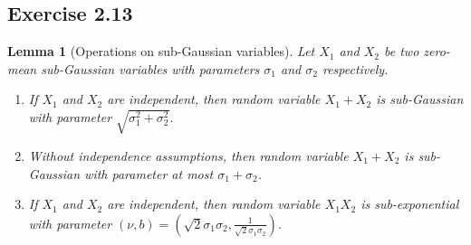 \documentclass[11pt]{article}
\newcommand{\of}[1]{\left(#1\right)}
\theoremstyle{plain}
\newtheorem{lem}{Lemma}
\theoremstyle{definition}
\begin{document}
\subsection{Exercise 2.13}
\begin{lem}[Operations on sub-Gaussian variables]
	Let $X_1$ and $X_2$ be two zero-mean sub-Gaussian variables with parameters $\sigma_1$ and $\sigma_2$ respectively. 
	\begin{enumerate}
		\item[(a).] If $X_1$ and $X_2$ are independent, then random variable $X_1 + X_2$ is sub-Gaussian with parameter $\sqrt{\sigma_1^2 + \sigma_2^2}$.
		\item[(b).] Without independence assumptions, then random variable $X_1 + X_2$ is sub-Gaussian with parameter at most 
		$\sigma_1 + \sigma_2$.
		\item[(c).] If $X_1$ and $X_2$ are independent, then random variable $X_1 X_2$ is sub-exponential with parameter $(\nu, b) = \of{\sqrt{2}\sigma_1 \sigma_2, \frac{1}{\sqrt{2}\sigma_1 \sigma_2}}$.
	\end{enumerate}
\end{lem}
\end{document}
